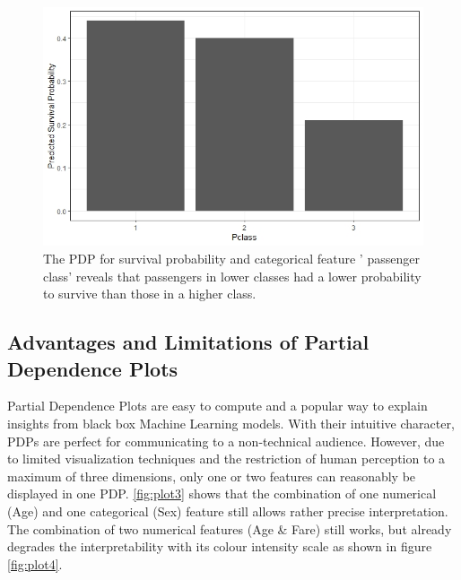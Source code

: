 \documentclass[
]{krantz}
\begin{document}
\begin{figure}

{\centering \includegraphics[width=0.8\linewidth]{images/PDP_Plot_2} 

}

\caption{The PDP for survival probability and categorical feature ' passenger class' reveals that passengers in lower classes had a lower probability to survive than those in a higher class.}\label{fig:plot2}
\end{figure}

\hypertarget{advantages-and-limitations-of-partial-dependence-plots}{%
\subsection{Advantages and Limitations of Partial Dependence Plots}\label{advantages-and-limitations-of-partial-dependence-plots}}

Partial Dependence Plots are easy to compute and a popular way to explain insights from black box Machine Learning models. With their intuitive character, PDPs are perfect for communicating to a non-technical audience. However, due to limited visualization techniques and the restriction of human perception to a maximum of three dimensions, only one or two features can reasonably be displayed in one PDP.\citep{molnar2019} \ref{fig:plot3} shows that the combination of one numerical (Age) and one categorical (Sex) feature still allows rather precise interpretation. The combination of two numerical features (Age \& Fare) still works, but already degrades the interpretability with its colour intensity scale as shown in figure \ref{fig:plot4}.
\end{document}
